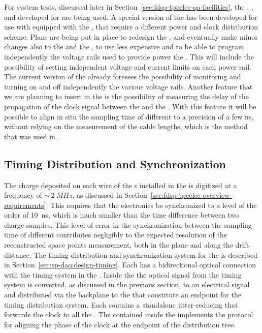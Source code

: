 For system tests, discussed later in Section~\ref{sec:fdsp-tpcelec-qa-facilities},
the , , and  developed for 
are being used. A special version of the  has been developed
for use with  equipped with the  ,
that require a different power and clock distribution scheme. Plans are
being put in place to redesign the , and eventually make 
minor changes also to the  and the , to use 
less expensive  and to be able to program independently
the voltage rails used to provide power the . This will include
the possibility of setting independent voltage and current limits on each power
rail. The current  version of the  already foresees
the possibility of monitoring and turning on and off independently the
various voltage rails. Another feature that we are planning to insert in
the  is the possibility of measuring the delay of the propagation
of the clock signal between the  and the . With
this feature it will be possible to align in situ the sampling time of different
 to a precision of a few ns, without relying on the 
measurement of the cable lengths, which is the method that was used
in .


\subsection{Timing Distribution and Synchronization}
\label{sec:fdsp-tpcelec-design-timing}

The charge deposited on each wire of the s installed 
in the   is digitized at a frequency of
$\sim\,\SI{2}{MHz}$, as discussed in 
Section~\ref{sec:fdsp-tpcelec-overview-requirements}. This requires
that the  electronics be synchronized to a level of the order of \SI{10}{ns}, which is
much smaller than the time difference between two charge samples.
This level of error in the synchronization between the sampling time of different
 contributes negligibly to the expected resolution %
of the reconstructed space points measurement,
both in the  plane and along the drift distance.
The timing distribution and synchronization system for the 
 is described in Section~\ref{sec:sp-daq:design-timing}.
Each  has a bidirectional optical connection with the
timing system in the . Inside the  the optical
signal from the timing system is converted, as discussed in the previous
section, to an electrical signal and distributed via the backplane to
the  that constitute an endpoint for the timing distribution
system. Each  contains a standalone jitter-reducing  
that forwards the clock to all the . The
 contained inside the  implements the 
protocol~\cite{bib:docdb1651,bib:docdb11233} for aligning
the phase of the clock at the endpoint of the distribution tree.

